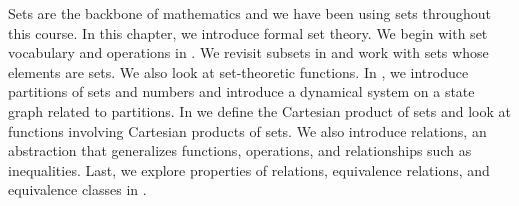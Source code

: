 Sets are the backbone of mathematics and we have been using sets throughout this course.  In this chapter, we introduce formal set theory.  We begin with set vocabulary and operations in  {\secsets}.  We revisit subsets in  {\secsubsets} and work with sets whose elements are sets. We also look at set-theoretic functions.  In  {\secpartitions}, we introduce partitions of sets and numbers and introduce a dynamical system on a state graph related to partitions.  In  {\secrel} we define the Cartesian product of sets and look at functions involving Cartesian products of sets.  We also introduce relations, an abstraction that generalizes functions, operations, and relationships such as inequalities.  Last, we explore properties of relations, equivalence relations, and equivalence classes in  {\secequivrel}.